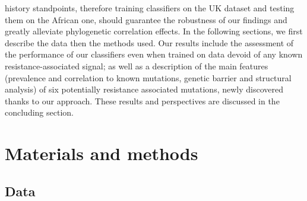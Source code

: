 \documentclass[
  11,
]{scrbook}
\begin{document}
history standpoints, therefore training classifiers on the UK dataset
and testing them on the African one, should guarantee the robustness of
our findings and greatly alleviate phylogenetic correlation effects. In
the following sections, we first describe the data then the methods
used. Our results include the assessment of the performance of our
classifiers even when trained on data devoid of any known
resistance-associated signal; as well as a description of the main
features (prevalence and correlation to known mutations, genetic barrier
and structural analysis) of six potentially resistance associated
mutations, newly discovered thanks to our approach. These results and
perspectives are discussed in the concluding section.

\hypertarget{materials-and-methods}{%
\section{Materials and methods}\label{materials-and-methods}}

\hypertarget{data}{%
\subsection{Data}\label{data}}
\end{document}
